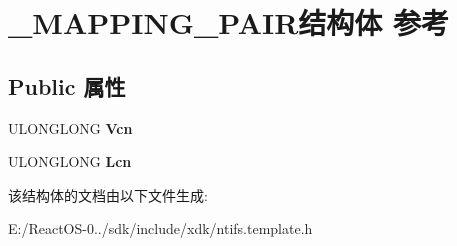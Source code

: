 \hypertarget{struct___m_a_p_p_i_n_g___p_a_i_r}{}\section{\+\_\+\+M\+A\+P\+P\+I\+N\+G\+\_\+\+P\+A\+I\+R结构体 参考}
\label{struct___m_a_p_p_i_n_g___p_a_i_r}
\subsection*{Public 属性}
\begin{DoxyCompactItemize}
\item 
\mbox{\label{struct___m_a_p_p_i_n_g___p_a_i_r_ab328448f632d83a00b490302623000ff}} 
U\+L\+O\+N\+G\+L\+O\+NG {\bfseries Vcn}
\item 
\mbox{\label{struct___m_a_p_p_i_n_g___p_a_i_r_a8e53aefbc0bdb33389b62a50d403f8e2}} 
U\+L\+O\+N\+G\+L\+O\+NG {\bfseries Lcn}
\end{DoxyCompactItemize}


该结构体的文档由以下文件生成\+:\begin{DoxyCompactItemize}
\item 
E\+:/\+React\+O\+S-\/0../sdk/include/xdk/ntifs.\+template.\+h\end{DoxyCompactItemize}
